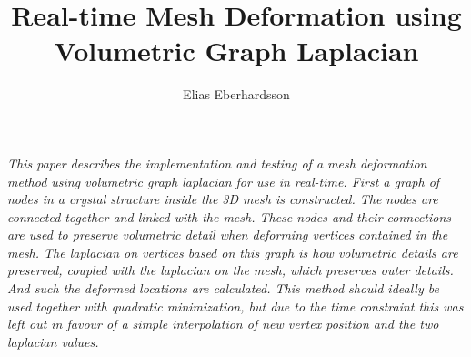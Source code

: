 \documentclass[10pt]{article}
\title{\textbf{Real-time Mesh Deformation using Volumetric Graph Laplacian}}
\author{Elias Eberhardsson}
\date{}
\begin{document}
\maketitle

\textit{
This paper describes the implementation and testing of a mesh deformation method using volumetric graph laplacian for use in real-time. First a graph of nodes in a crystal structure inside the 3D mesh is constructed. The nodes are connected together and linked with the mesh. These nodes and their connections are used to preserve volumetric detail when deforming vertices contained in the mesh. The laplacian on vertices based on this graph is how volumetric details are preserved, coupled with the laplacian on the mesh, which preserves outer details. And such the deformed locations are calculated. This method should ideally be used together with quadratic minimization, but due to the time constraint this was left out in favour of a simple interpolation of new vertex position and the two laplacian values.
}
\end{document}
